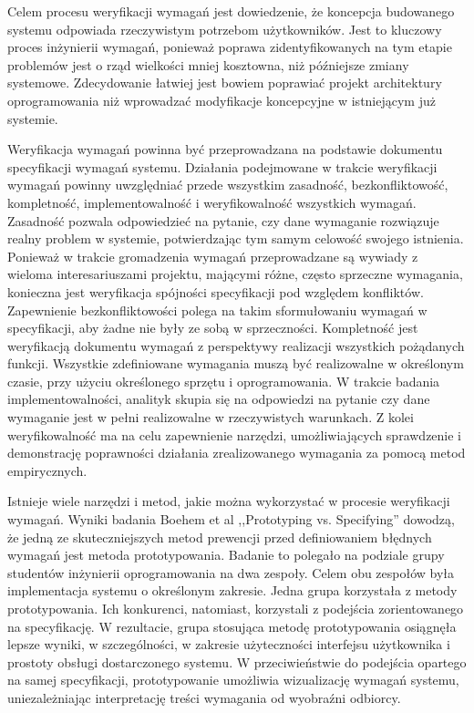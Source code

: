         Celem procesu weryfikacji wymagań jest dowiedzenie, że koncepcja budowanego systemu odpowiada rzeczywistym potrzebom użytkowników. Jest to kluczowy proces inżynierii wymagań, ponieważ poprawa zidentyfikowanych na tym etapie problemów jest o rząd wielkości mniej kosztowna, niż późniejsze zmiany systemowe. Zdecydowanie łatwiej jest bowiem poprawiać projekt architektury oprogramowania niż wprowadzać modyfikacje koncepcyjne w istniejącym już systemie. 

        Weryfikacja wymagań powinna być przeprowadzana na podstawie dokumentu specyfikacji wymagań systemu. Działania podejmowane w trakcie weryfikacji wymagań powinny uwzględniać przede wszystkim zasadność, bezkonfliktowość, kompletność, implementowalność i weryfikowalność wszystkich wymagań. Zasadność pozwala odpowiedzieć na pytanie, czy dane wymaganie rozwiązuje realny problem w systemie, potwierdzając tym samym celowość swojego istnienia. Ponieważ w trakcie gromadzenia wymagań przeprowadzane są wywiady z wieloma interesariuszami projektu, mającymi różne, często sprzeczne wymagania, konieczna jest weryfikacja spójności specyfikacji pod względem konfliktów. Zapewnienie bezkonfliktowości polega na takim sformułowaniu wymagań w specyfikacji, aby żadne nie były ze sobą w sprzeczności. Kompletność jest weryfikacją dokumentu wymagań z perspektywy realizacji wszystkich pożądanych funkcji. Wszystkie zdefiniowane wymagania muszą być realizowalne w określonym czasie, przy użyciu określonego sprzętu i oprogramowania. W trakcie badania implementowalności, analityk skupia się na odpowiedzi na pytanie czy dane wymaganie jest w pełni realizowalne w rzeczywistych warunkach. Z kolei weryfikowalność ma na celu zapewnienie narzędzi, umożliwiających sprawdzenie i demonstrację poprawności działania zrealizowanego wymagania za pomocą metod empirycznych.

        Istnieje wiele narzędzi i metod, jakie można wykorzystać w procesie weryfikacji wymagań. Wyniki badania Boehem et al ,,Prototyping vs. Specifying'' \cite{Boehm84} dowodzą, że jedną ze skuteczniejszych metod prewencji przed definiowaniem błędnych wymagań jest metoda prototypowania. Badanie to polegało na podziale grupy studentów inżynierii oprogramowania na dwa zespoły. Celem obu zespołów była implementacja systemu o określonym zakresie. Jedna grupa korzystała z metody prototypowania. Ich konkurenci, natomiast, korzystali z podejścia zorientowanego na specyfikację. W rezultacie, grupa stosująca metodę prototypowania osiągnęła lepsze wyniki, w szczególności, w zakresie użyteczności interfejsu użytkownika i prostoty obsługi dostarczonego systemu. W przeciwieństwie do podejścia opartego na samej specyfikacji, prototypowanie umożliwia wizualizację wymagań systemu, uniezależniając interpretację treści wymagania od wyobraźni odbiorcy. 

